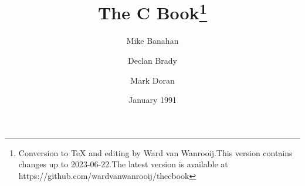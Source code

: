 \documentclass[12pt,twoside,a4paper]{book}
\begin{document}
\frontmatter
\title{The C Book\thanks{Conversion to TeX and editing by Ward van Wanrooij.\newline This version contains changes up to 2023-06-22.\newline The latest version is available at https://github.com/wardvanwanrooij/thecbook}}
\author{Mike Banahan \and Declan Brady \and Mark Doran}
\date{January 1991}
\maketitle
{}
\newpage
{}
\setcounter{page}{1}
\tableofcontents
\mainmatter




{}
\end{document}
